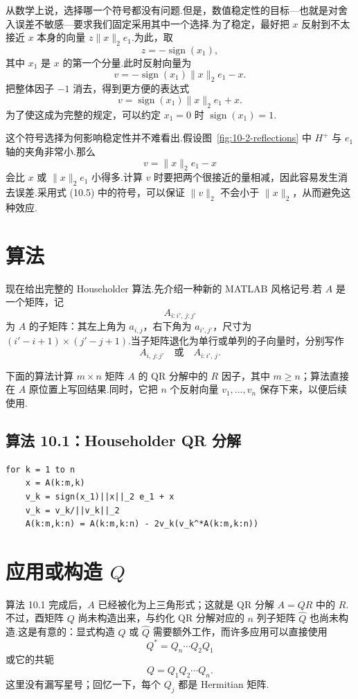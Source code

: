\documentclass[UTF8,fontset=none,12pt]{ctexart}
\newcommand{\sign}{\operatorname{sign}}
\begin{document}
从数学上说，选择哪一个符号都没有问题.但是，数值稳定性的目标---也就是对舍入误差不敏感---要求我们固定采用其中一个选择.为了稳定，最好把 $x$ 反射到不太接近 $x$ 本身的向量 $z\|x\|_2e_1$.为此，取
\[
    z=-\sign(x_1),
\]
其中 $x_1$ 是 $x$ 的第一个分量.此时反射向量为
\[
    v=-\sign(x_1)\|x\|_2e_1-x.
\]
把整体因子 $-1$ 消去，得到更方便的表达式
\begin{equation}
    v=\sign(x_1)\|x\|_2e_1+x.
    \tag{10.5}
\end{equation}
为了使这成为完整的规定，可以约定 $x_1=0$ 时 $\sign(x_1)=1$.

这个符号选择为何影响稳定性并不难看出.假设图~\ref{fig:10-2-reflections} 中 $H^+$ 与 $e_1$ 轴的夹角非常小.那么
\[
    v=\|x\|_2e_1-x
\]
会比 $x$ 或 $\|x\|_2e_1$ 小得多.计算 $v$ 时要把两个很接近的量相减，因此容易发生消去误差.采用式 (10.5) 中的符号，可以保证 $\|v\|_2$ 不会小于 $\|x\|_2$，从而避免这种效应.

\section*{算法}

现在给出完整的 Householder 算法.先介绍一种新的 MATLAB 风格记号.若 $A$ 是一个矩阵，记
\[
    A_{i:i',\,j:j'}
\]
为 $A$ 的子矩阵：其左上角为 $a_{i,j}$，右下角为 $a_{i',j'}$，尺寸为 $(i'-i+1)\times(j'-j+1)$.当子矩阵退化为单行或单列的子向量时，分别写作
\[
    A_{i,\,j:j'}\quad\text{或}\quad A_{i:i',\,j}.
\]

下面的算法计算 $m\times n$ 矩阵 $A$ 的 QR 分解中的 $R$ 因子，其中 $m\ge n$；算法直接在 $A$ 原位置上写回结果.同时，它把 $n$ 个反射向量 $v_1,\ldots,v_n$ 保存下来，以便后续使用.

\subsection*{算法 10.1：Householder QR 分解}

\begin{verbatim}
for k = 1 to n
    x = A(k:m,k)
    v_k = sign(x_1)||x||_2 e_1 + x
    v_k = v_k/||v_k||_2
    A(k:m,k:n) = A(k:m,k:n) - 2v_k(v_k^*A(k:m,k:n))
\end{verbatim}

\section*{应用或构造 $Q$}

算法 10.1 完成后，$A$ 已经被化为上三角形式；这就是 QR 分解 $A=QR$ 中的 $R$.不过，酉矩阵 $Q$ 尚未构造出来，与约化 QR 分解对应的 $n$ 列子矩阵 $\widehat Q$ 也尚未构造.这是有意的：显式构造 $Q$ 或 $\widehat Q$ 需要额外工作，而许多应用可以直接使用
\begin{equation}
    Q^*=Q_n\cdots Q_2Q_1
    \tag{10.6}
\end{equation}
或它的共轭
\begin{equation}
    Q=Q_1Q_2\cdots Q_n.
    \tag{10.7}
\end{equation}
这里没有漏写星号；回忆一下，每个 $Q_j$ 都是 Hermitian 矩阵.
\end{document}
